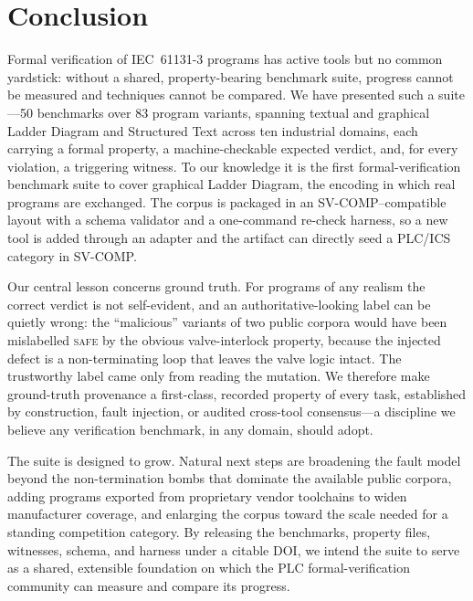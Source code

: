 \section{Conclusion}
\label{sec:conclusion}

Formal verification of IEC~61131-3 programs has active tools but no common yardstick: without
a shared, property-bearing benchmark suite, progress cannot be measured and techniques cannot be
compared. We have presented such a suite---50 benchmarks over 83 program variants, spanning
textual and graphical Ladder Diagram and Structured Text across ten industrial domains, each
carrying a formal property, a machine-checkable expected verdict, and, for every violation, a
triggering witness. To our knowledge it is the first formal-verification benchmark suite to cover
graphical Ladder Diagram, the encoding in which real programs are exchanged. The corpus is
packaged in an SV-COMP--compatible layout with a schema validator and a one-command re-check
harness, so a new tool is added through an adapter and the artifact can directly seed a PLC/ICS
category in SV-COMP.

Our central lesson concerns ground truth. For programs of any realism the correct verdict is not
self-evident, and an authoritative-looking label can be quietly wrong: the ``malicious'' variants
of two public corpora would have been mislabelled \textsc{safe} by the obvious valve-interlock
property, because the injected defect is a non-terminating loop that leaves the valve logic
intact. The trustworthy label came only from reading the mutation. We therefore make ground-truth
provenance a first-class, recorded property of every task, established by construction, fault
injection, or audited cross-tool consensus---a discipline we believe any verification benchmark,
in any domain, should adopt.

The suite is designed to grow. Natural next steps are broadening the fault model beyond the
non-termination bombs that dominate the available public corpora, adding programs exported from
proprietary vendor toolchains to widen manufacturer coverage, and enlarging the corpus toward the
scale needed for a standing competition category. By releasing the benchmarks, property files,
witnesses, schema, and harness under a citable DOI, we intend the suite to serve as a shared,
extensible foundation on which the PLC formal-verification community can measure and compare its
progress.


